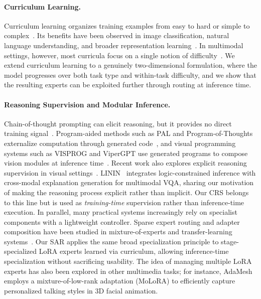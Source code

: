 \documentclass[journal]{IEEEtran}
\newcommand{\crs}{CRS}
\newcommand{\sar}{SAR}
\begin{document}
\paragraph{Curriculum Learning.}
Curriculum learning organizes training examples from easy to hard or simple to complex~\cite{bengio2009curriculum}.
Its benefits have been observed in image classification, natural language understanding, and broader representation learning~\cite{hacohen2019power,xu2020curriculum,soviany2022curriculum}.
In multimodal settings, however, most curricula focus on a single notion of difficulty~\cite{shen2021much}.
We extend curriculum learning to a genuinely two-dimensional formulation, where the model progresses over both task type and within-task difficulty, and we show that the resulting experts can be exploited further through routing at inference time.

\paragraph{Reasoning Supervision and Modular Inference.}
Chain-of-thought prompting can elicit reasoning, but it provides no direct training signal~\cite{wei2022chain}.
Program-aided methods such as PAL and Program-of-Thoughts externalize computation through generated code~\cite{gao2023pal,chen2022program}, and visual programming systems such as VISPROG and ViperGPT use generated programs to compose vision modules at inference time~\cite{gupta2022visprog,suris2023vipergpt}.
Recent work also explores explicit reasoning supervision in visual settings~\cite{lu2024mathvista,shao2024visual}.
LININ~\cite{xue2025linin} integrates logic-constrained inference with cross-modal explanation generation for multimodal VQA, sharing our motivation of making the reasoning process explicit rather than implicit.
Our \crs{} belongs to this line but is used as \emph{training-time} supervision rather than inference-time execution.
In parallel, many practical systems increasingly rely on specialist components with a lightweight controller.
Sparse expert routing and adapter composition have been studied in mixture-of-experts and transfer-learning systems~\cite{fedus2022switch,pfeiffer2021adapterfusion,huang2024lorahub}.
Our \sar{} applies the same broad specialization principle to stage-specialized LoRA experts learned via curriculum, allowing inference-time specialization without sacrificing usability.
The idea of managing multiple LoRA experts has also been explored in other multimedia tasks; for instance, AdaMesh~\cite{chen2025adamesh} employs a mixture-of-low-rank adaptation (MoLoRA) to efficiently capture personalized talking styles in 3D facial animation.
\end{document}
